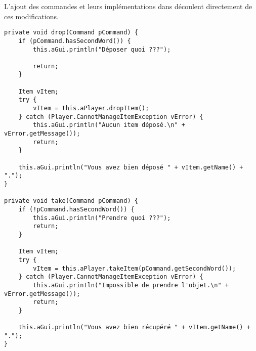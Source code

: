 \begin{exercise}[subtitle=Take et Drop]
L'ajout des commandes et leurs implémentations dans  découlent directement de ces modifications.

\begin{verbatim}
private void drop(Command pCommand) {
    if (pCommand.hasSecondWord()) {
        this.aGui.println("Déposer quoi ???");

        return;
    }

    Item vItem;
    try {
        vItem = this.aPlayer.dropItem();
    } catch (Player.CannotManageItemException vError) {
        this.aGui.println("Aucun item déposé.\n" + vError.getMessage());
        return;
    }

    this.aGui.println("Vous avez bien déposé " + vItem.getName() + ".");
}

private void take(Command pCommand) {
    if (!pCommand.hasSecondWord()) {
        this.aGui.println("Prendre quoi ???");
        return;
    }

    Item vItem;
    try {
        vItem = this.aPlayer.takeItem(pCommand.getSecondWord());
    } catch (Player.CannotManageItemException vError) {
        this.aGui.println("Impossible de prendre l'objet.\n" + vError.getMessage());
        return;
    }

    this.aGui.println("Vous avez bien récupéré " + vItem.getName() + ".");
}
\end{verbatim}
\end{exercise}

